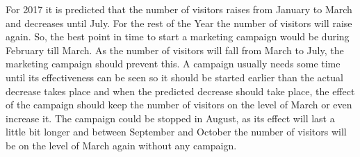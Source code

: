 \documentclass[journal]{IEEEtran}
\begin{document}
For 2017 it is predicted that the number of visitors raises from January to March and decreases until July. For the rest of the Year the number of visitors will raise again. So, the best point in time to start a marketing campaign would be during February till March. As the number of visitors will fall from March to July, the marketing campaign should prevent this. A campaign usually needs some time until its effectiveness can be seen so it should be started earlier than the actual decrease takes place and when the predicted decrease should take place, the effect of the campaign should keep the number of visitors on the level of March or even increase it. The campaign could be stopped in August, as its effect will last a little bit longer and between September and October the number of visitors will be on the level of March again without any campaign.


%
\end{document}
